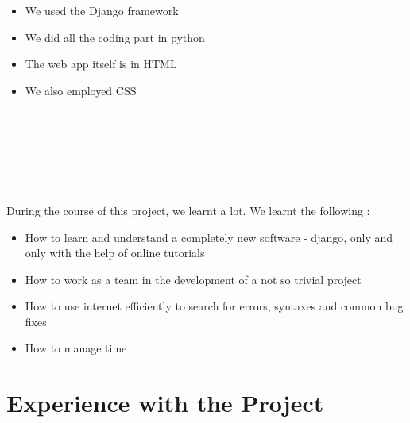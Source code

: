 \documentclass{article}
\begin{document}
\hspace*{5 mm} \\
\hspace*{5 mm} \\
\hspace*{5 mm} \\
\hspace*{5 mm} \\
\hspace*{5 mm}{\LARGE Platforms used in this project : }
\hspace*{5 mm} \\
\begin{itemize}
  \item We used the Django framework
  \item We did all the coding part in python
  \item The web app itself is in HTML
  \item We also employed CSS
  \pagebreak
\end{itemize}
\hspace*{5 mm} \\
\hspace*{5 mm} \\
\hspace*{5 mm} \\
\hspace*{5 mm} \\
\hspace*{5 mm}{\LARGE Things learnt in this project : }
\hspace*{5 mm} \\
\hspace*{5 mm} \\
\hspace*{5 mm} During the course of this project, we learnt a lot. We learnt the following : \\
\begin{itemize}
  \item How to learn and understand a completely new software - django, only and only with the help of online tutorials
  \item How to work as a team in the development of a not so trivial project
  \item How to use internet efficiently to search for errors, syntaxes and common bug fixes
  \item How to manage time
\end{itemize}
\pagebreak
\section{Experience with the Project}
\end{document}
